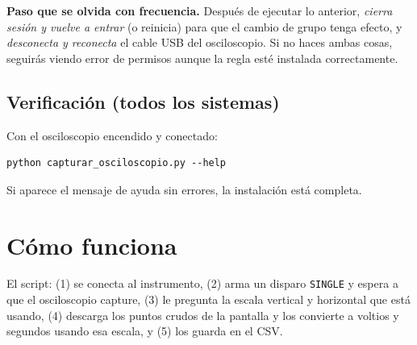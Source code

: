 \documentclass[11pt,a4paper]{article}
\begin{document}
\begin{aviso}
\textbf{Paso que se olvida con frecuencia.} Después de ejecutar lo anterior,
\emph{cierra sesión y vuelve a entrar} (o reinicia) para que el cambio de
grupo tenga efecto, y \emph{desconecta y reconecta} el cable USB del
osciloscopio. Si no haces ambas cosas, seguirás viendo error de permisos
aunque la regla esté instalada correctamente.
\end{aviso}

\subsection{Verificación (todos los sistemas)}
Con el osciloscopio encendido y conectado:
\begin{lstlisting}
python capturar_osciloscopio.py --help
\end{lstlisting}
Si aparece el mensaje de ayuda sin errores, la instalación está completa.

\section{Cómo funciona}
\begin{center}
\end{center}
\vspace{0.3em}
El script: (1) se conecta al instrumento, (2) arma un disparo \texttt{SINGLE}
y espera a que el osciloscopio capture, (3) le pregunta la escala vertical y
horizontal que está usando, (4) descarga los puntos crudos de la pantalla y
los convierte a voltios y segundos usando esa escala, y (5) los guarda en el
CSV.

\end{document}
